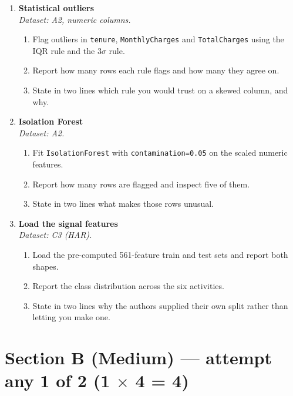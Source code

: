 \documentclass[11pt,a4paper]{article}
\begin{document}
\begin{enumerate}[label=\textbf{A\arabic*.}, leftmargin=*]

  \item \textbf{Statistical outliers} \\
    \emph{Dataset: A2, numeric columns.}
    \begin{enumerate}[label=(\alph*), leftmargin=*]
      \item Flag outliers in \texttt{tenure}, \texttt{MonthlyCharges} and \texttt{TotalCharges} using the IQR rule and the $3\sigma$ rule.
      \item Report how many rows each rule flags and how many they agree on.
      \item State in two lines which rule you would trust on a skewed column, and why.
    \end{enumerate}

  \item \textbf{Isolation Forest} \\
    \emph{Dataset: A2.}
    \begin{enumerate}[label=(\alph*), leftmargin=*]
      \item Fit \texttt{IsolationForest} with \texttt{contamination=0.05} on the scaled numeric features.
      \item Report how many rows are flagged and inspect five of them.
      \item State in two lines what makes those rows unusual.
    \end{enumerate}

  \item \textbf{Load the signal features} \\
    \emph{Dataset: C3 (HAR).}
    \begin{enumerate}[label=(\alph*), leftmargin=*]
      \item Load the pre-computed 561-feature train and test sets and report both shapes.
      \item Report the class distribution across the six activities.
      \item State in two lines why the authors supplied their own split rather than letting you make one.
    \end{enumerate}

\end{enumerate}

\section*{Section B (Medium) --- attempt any 1 of 2 \quad (1 $\times$ 4 = 4)}
\end{document}
